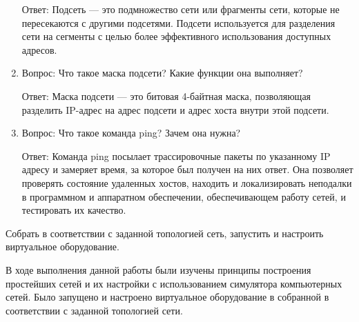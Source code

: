\documentclass[14pt]{extarticle}
\makeatletter
\newcounter{sectionc} %
\newcommand{\nonumbersections}{\renewcommand{\Hy@numberline}[1]{}}
\let\oldsectionc\sectionc
\renewcommand{\sectionc}{\nonumbersections\oldsectionc}
\makeatother
\begin{document}
\begin{enumerate}
    Ответ: Подсеть — это подмножество сети или фрагменты сети, которые не пересекаются с другими подсетями. Подсети используется для разделения сети на сегменты с целью более эффективного использования доступных адресов.
    \item Вопрос: Что такое маска подсети? Какие функции она выполняет?

    Ответ: Маска подсети — это битовая 4-байтная маска, позволяющая разделить IP-адрес на адрес подсети и адрес хоста внутри этой подсети.
    \item Вопрос: Что такое команда ping? Зачем она нужна?

    Ответ: Команда ping посылает трассировочные пакеты по указанному IP адресу и замеряет время, за которое был получен на них ответ. Она позволяет проверять состояние удаленных хостов, находить и локализировать неподалки в программном и аппаратном обеспечении, обеспечивающем работу сетей, и тестировать их качество.
\end{enumerate}


Собрать в соответствии с заданной топологией сеть, запустить и настроить виртуальное оборудование.

В ходе выполнения данной работы были изучены принципы построения простейших сетей и их настройки с использованием симулятора компьютерных сетей. Было запущено и настроено виртуальное оборудование в собранной в соответствии с заданной топологией сети.
\end{document}
